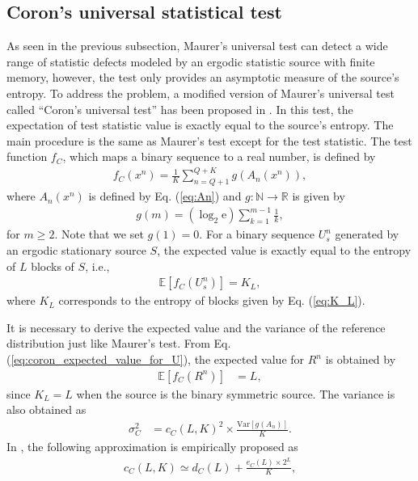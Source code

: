 \subsection{Coron's universal statistical test}
As seen in the previous subsection, Maurer's universal test can detect a wide range of statistic defects modeled by an ergodic statistic source with finite memory, however, the test only provides an asymptotic measure of the source's entropy. 
%
To address the problem, a modified version of Maurer's universal test called ``Coron's universal test'' has been proposed in \cite{coron1999security}. In this test, the expectation of test statistic value is exactly equal to the source's entropy. The main procedure is the same as Maurer's test except for the test statistic. The test function $f_C$, which maps a binary sequence to a real number, is defined by 
\begin{align}\label{eq:fC}
	f_C(x^n) = \frac{1}{K} \sum_{n=Q+1}^{Q+K} g(A_n(x^n)),
\end{align}
where $A_n(x^n)$ is defined by Eq. (\ref{eq:An}) and $g:\mathbb{N}\to\mathbb{R}$ is given by
\begin{align}\label{eq:function_g}
	g(m) = (\log_2 \mathrm{e}) \sum_{k=1}^{m-1}\frac{1}{k},
\end{align}
for $m\geq 2$. Note that we set $g(1)=0$.
%
For a binary sequence $U_s^n$ generated by an ergodic stationary source $S$, the expected value is exactly equal to the entropy of $L$ blocks of $S$, i.e.,
\begin{align}\label{eq:coron_expected_value_for_U}
	\mathbb{E}[f_C(U_s^n)] = K_L,
\end{align}
where $K_L$ corresponds to the entropy of blocks given by Eq. (\ref{eq:K_L}).
%
\par
It is necessary to derive the expected value and the variance of the reference distribution just like Maurer's test. From Eq. (\ref{eq:coron_expected_value_for_U}), the expected value for $R^n$ is obtained by
\begin{align}
\label{eq:coron_expected_value_truly_random}
	\mathbb{E}[f_C(R^n)] &= L, 
\end{align}
since $K_L=L$ when the source is the binary symmetric source. 
The variance is also obtained as
\begin{align}
	\sigma_C^2 &= c_C(L,K)^2 \times	\frac{\mathrm{Var}[g(A_n)]}{K}.
\end{align}
In \cite{coron1999security}, the following approximation is empirically proposed as
\begin{align}
	c_C(L,K) \simeq d_C(L) + \frac{e_C(L)\times 2^L}{K},
\end{align}
